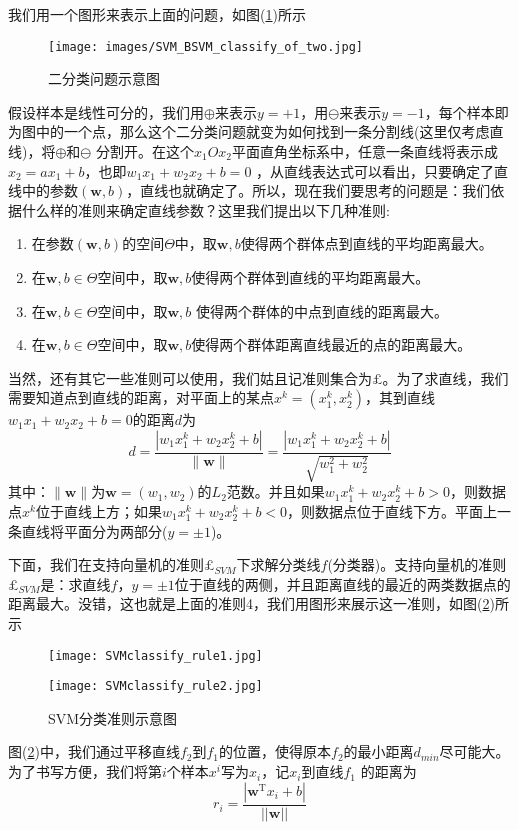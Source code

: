 	我们用一个图形来表示上面的问题，如图(\ref{fig:二分类问题示意图})所示
		\begin{figure}[H]
		\centering
		\texttt{[image: images/SVM\_BSVM\_classify\_of\_two.jpg]}
		\caption{二分类问题示意图}
		\label{fig:二分类问题示意图}
		\end{figure}
	假设样本是线性可分的，我们用$\oplus$来表示$y=+1$，用$\ominus$来表示$y=-1$，每个样本即为图中的一个点，那么这个二分类问题就变为如何找到一条分割线(这里仅考虑直线)，将$\oplus$和$\ominus$ 分割开。在这个$x_1Ox_2$平面直角坐标系中，任意一条直线将表示成$x_2=ax_1+b$，也即$w_1x_1+w_2x_2+b=0$ ，从直线表达式可以看出，只要确定了直线中的参数$(\mathbf w,b)$，直线也就确定了。所以，现在我们要思考的问题是：我们依据什么样的准则来确定直线参数？这里我们提出以下几种准则:
	\begin{enumerate}
	    \item 在参数$(\mathbf w,b)$的空间$\Theta$中，取$\mathbf w,b$使得两个群体点到直线的平均距离最大。
	    \item 在$\mathbf w,b\in \Theta$空间中，取$\mathbf w,b$使得两个群体到直线的平均距离最大。
	    \item 在$\mathbf w,b\in \Theta$空间中，取$\mathbf w,b$ 使得两个群体的中点到直线的距离最大。
	    \item 在$\mathbf w,b\in \Theta$空间中，取$\mathbf w,b$使得两个群体距离直线最近的点的距离最大。
	\end{enumerate}
	\par
	当然，还有其它一些准则可以使用，我们姑且记准则集合为$\pounds$。为了求直线，我们需要知道点到直线的距离，对平面上的某点$x^k=(x_1^k,x_2^k)$，其到直线$w_1x_1+w_2x_2+b=0$的距离$d$为
	\[
	d=\frac{| w_1x_1^k+w_2x_2^k+b| }{\|\mathbf w\|} = \frac{| w_1x_1^k+w_2x_2^k+b| }{\sqrt {w_1^2+w_2^2}}
	\]
	其中：$\|\mathbf w\|$为$\mathbf w=(w_1,w_2)$的$L_2$范数。并且如果$w_1x_1^k+w_2x_2^k+b>0$，则数据点$x^k$位于直线上方；如果$w_1x_1^k+w_2x_2^k+b<0$，则数据点位于直线下方。平面上一条直线将平面分为两部分($y=\pm 1$)。
	\par
	下面，我们在支持向量机的准则$\pounds _{SVM}$下求解分类线$f$(分类器)。支持向量机的准则$\pounds _{SVM}$是：求直线$f$，$y=\pm 1$位于直线的两侧，并且距离直线的最近的两类数据点的距离最大。没错，这也就是上面的准则4，我们用图形来展示这一准则，如图(\ref{fig:SVM分类准则示意图})所示
		\begin{figure}[H]
		\centering
		\begin{varwidth}[t]{\textwidth}
		\vspace{0pt}
		\texttt{[image: SVMclassify\_rule1.jpg]}
		\end{varwidth}
		\qquad
		\begin{varwidth}[t]{\textwidth}
		\vspace{0pt}
		\texttt{[image: SVMclassify\_rule2.jpg]}
		\end{varwidth}
		\caption{SVM分类准则示意图}
		\label{fig:SVM分类准则示意图}
		\end{figure}
	图(\ref{fig:SVM分类准则示意图})中，我们通过平移直线$f_2$到$f_1$的位置，使得原本$f_2$的最小距离$d_{min}$尽可能大。为了书写方便，我们将第$i$个样本$x^i$写为$x_i$，记$x_i$到直线$f_1$ 的距离为
	\[
	r_i=\frac{|\mathbf w^ \mathrm{ T } x_i+b |}{||\mathbf w||}
	\]

